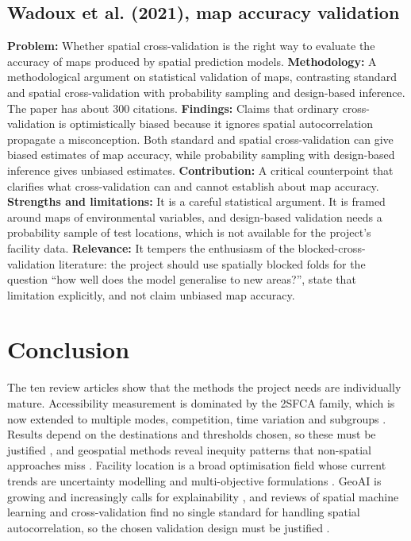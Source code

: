 \documentclass[pdflatex,sn-mathphys-num]{sn-jnl}
\begin{document}
\subsection{Wadoux et al. (2021), map accuracy validation \cite{wadoux2021}}
\textbf{Problem:} Whether spatial cross-validation is the right way to evaluate the accuracy of maps produced by spatial prediction models.
\textbf{Methodology:} A methodological argument on statistical validation of maps, contrasting standard and spatial cross-validation with probability sampling and design-based inference. The paper has about 300 citations.
\textbf{Findings:} Claims that ordinary cross-validation is optimistically biased because it ignores spatial autocorrelation propagate a misconception. Both standard and spatial cross-validation can give biased estimates of map accuracy, while probability sampling with design-based inference gives unbiased estimates.
\textbf{Contribution:} A critical counterpoint that clarifies what cross-validation can and cannot establish about map accuracy.
\textbf{Strengths and limitations:} It is a careful statistical argument. It is framed around maps of environmental variables, and design-based validation needs a probability sample of test locations, which is not available for the project's facility data.
\textbf{Relevance:} It tempers the enthusiasm of the blocked-cross-validation literature: the project should use spatially blocked folds for the question ``how well does the model generalise to new areas?'', state that limitation explicitly, and not claim unbiased map accuracy.

\section{Conclusion}
\label{sec:conclusion}

The ten review articles show that the methods the project needs are individually mature. Accessibility measurement is dominated by the 2SFCA family, which is now extended to multiple modes, competition, time variation and subgroups \cite{stacherl2023,park2021}. Results depend on the destinations and thresholds chosen, so these must be justified \cite{ravensbergen2022}, and geospatial methods reveal inequity patterns that non-spatial approaches miss \cite{rwandashi2026}. Facility location is a broad optimisation field whose current trends are uncertainty modelling and multi-objective formulations \cite{saldanha2022,dissanayake2024}. GeoAI is growing and increasingly calls for explainability \cite{liu2022,boutayeb2025}, and reviews of spatial machine learning and cross-validation find no single standard for handling spatial autocorrelation, so the chosen validation design must be justified \cite{jemeljanova2024,otto2024}.
\end{document}
